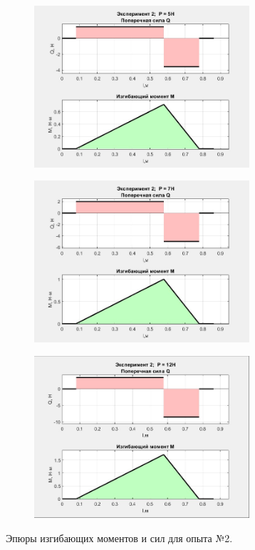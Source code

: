 \documentclass[12pt, a4paper]{article}
\begin{document}
\begin{figure}[h!]
\begin{subfigure}{0.4\textwidth}
        \end{subfigure}
        \hspace{1.2cm}
        \begin{subfigure}{0.4\textwidth}
            \centering
            \includegraphics[width = 8cm]{r_2_5.jpg}
        \end{subfigure}
        \vspace{0cm}
        \hspace{-0.5cm}
        \begin{subfigure}{0.4\textwidth}
            \centering
            \includegraphics[width = 8cm]{r_2_7.jpg}
        \end{subfigure}
        \hspace{1.2cm}
        \begin{subfigure}{0.4\textwidth}
            \centering
            \includegraphics[width = 8cm]{r_2_12.jpg}
        \end{subfigure}
        \caption{\centering Эпюры изгибающих моментов и сил для опыта №2.}
        \label{fig4}
    \end{figure}
    
\end{document}
